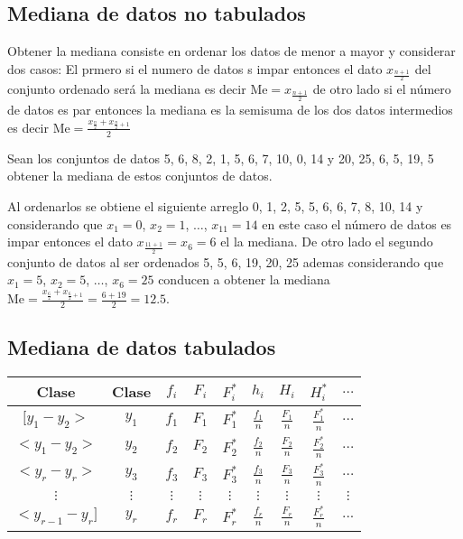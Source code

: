 \documentclass[10pt,]{krantz}
\theoremstyle{definition}
\theoremstyle{definition}
\theoremstyle{definition}
\theoremstyle{remark}
\let\BeginKnitrBlock\begin \let\EndKnitrBlock\end
\begin{document}
\hypertarget{mediana-de-datos-no-tabulados}{%
\subsection{Mediana de datos no tabulados}\label{mediana-de-datos-no-tabulados}}

Obtener la mediana consiste en ordenar los datos de menor a mayor y considerar dos casos: El prmero si el numero de datos s impar entonces el dato \(x_{\frac{n+1}{2}}\) del conjunto ordenado será la mediana es decir \(\text{Me}=x_{\frac{n+1}{2}}\) de otro lado si el número de datos es par entonces la mediana es la semisuma de los dos datos intermedios es decir \(\text{Me}=\frac{x_{\frac{n}{2}}+x_{\frac{n}{2}+1}}{2}\)

\BeginKnitrBlock{exercise}
\protect\hypertarget{exr:unnamed-chunk-7}{}{\label{exr:unnamed-chunk-7} }Sean los conjuntos de datos 5, 6, 8, 2, 1, 5, 6, 7, 10, 0, 14 y 20, 25, 6, 5, 19, 5 obtener la mediana de estos conjuntos de datos.
\EndKnitrBlock{exercise}

\BeginKnitrBlock{solution}
\iffalse{} {Solución. } \fi{}Al ordenarlos se obtiene el siguiente arreglo 0, 1, 2, 5, 5, 6, 6, 7, 8, 10, 14 y considerando que \(x_1=0\), \(x_2=1\), \(\ldots\), \(x_{11}=14\) en este caso el número de datos es impar entonces el dato \(x_{\frac{11+1}{2}}=x_{6}=6\) el la mediana. De otro lado el segundo conjunto de datos al ser ordenados 5, 5, 6, 19, 20, 25 ademas considerando que \(x_1=5\), \(x_2=5\), \(\ldots\), \(x_6=25\) conducen a obtener la mediana \(\text{Me}=\frac{x_{\frac{6}{2}}+x_{\frac{6}{2}+1}}{2}=\frac{6+19}{2}=12.5\).
\EndKnitrBlock{solution}

\hypertarget{mediana-de-datos-tabulados}{%
\subsection{Mediana de datos tabulados}\label{mediana-de-datos-tabulados}}

\begin{longtable}[]{@{}ccccccccc@{}}
\toprule
Clase & Clase & \(f_i\) & \(F_i\) & \(F_i^*\) & \(h_i\) & \(H_i\) & \(H_i^*\) & \(\ldots\)\tabularnewline
\midrule
\endhead
\([y_1-y_2>\) & \(y_1\) & \(f_1\) & \(F_1\) & \(F_1^*\) & \(\frac{f_1}{n}\) & \(\frac{F_1}{n}\) & \(\frac{F_1^*}{n}\) & \(\ldots\)\tabularnewline
\(<y_1-y_2>\) & \(y_2\) & \(f_2\) & \(F_2\) & \(F_2^*\) & \(\frac{f_2}{n}\) & \(\frac{F_2}{n}\) & \(\frac{F_2^*}{n}\) & \(\ldots\)\tabularnewline
\(<y_{r}-y_r>\) & \(y_3\) & \(f_3\) & \(F_3\) & \(F_3^*\) & \(\frac{f_3}{n}\) & \(\frac{F_3}{n}\) & \(\frac{F_3^*}{n}\) & \(\ldots\)\tabularnewline
\(\vdots\) & \(\vdots\) & \(\vdots\) & \(\vdots\) & \(\vdots\) & \(\vdots\) & \(\vdots\) & \(\vdots\) & \(\vdots\)\tabularnewline
\(<y_{r-1}-y_r]\) & \(y_r\) & \(f_r\) & \(F_r\) & \(F_r^*\) & \(\frac{f_r}{n}\) & \(\frac{F_r}{n}\) & \(\frac{F_r^*}{n}\) & \(...\)\tabularnewline
\bottomrule
\end{longtable}
\end{document}
